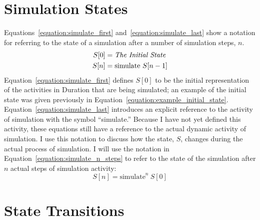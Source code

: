 \section{Simulation States}

Equations~\ref{equation:simulate_first}
and~\ref{equation:simulate_last} show a notation for referring to the
state of a simulation after a number of simulation steps, $n$.
\begin{align}
\label{equation:simulate_first}
S[0] &= \text{\emph{The Initial State}} \\
\label{equation:simulate_last}
S[n] &= \text{simulate}~S[n-1]
\end{align}
Equation~\ref{equation:simulate_first} defines $S[0]$ to be the
initial representation of the activities in Duration that are being
simulated; an example of the initial state was given previously in
Equation~\ref{equation:example_initial_state}.
Equation~\ref{equation:simulate_last} introduces an explicit reference
to the activity of simulation with the symbol ``simulate.''  Because I
have not yet defined this activity, these equations still have a
reference to the actual dynamic activity of simulation.  I use this
notation to discuss how the state, $S$, changes during the actual
process of simulation.  I will use the notation in
Equation~\ref{equation:simulate_n_steps} to refer to the state of the
simulation after $n$ actual steps of simulation activity:
\begin{equation}
\label{equation:simulate_n_steps}
S[n] = \text{simulate}^n~S[0]
\end{equation}

\section{State Transitions}

